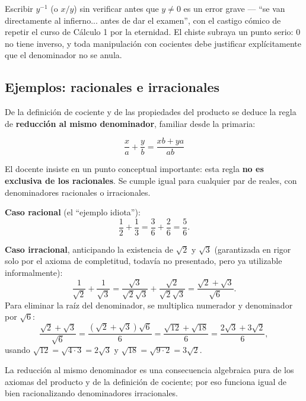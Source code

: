 \documentclass[12pt,a4paper]{article}
\begin{document}
\begin{warnbox}
Escribir $y^{-1}$ (o $x/y$) sin verificar antes que $y\ne 0$ es un error
grave --- ``se van directamente al infierno... antes de dar el examen'',
con el castigo cómico de repetir el curso de Cálculo 1 por la eternidad. El
chiste subraya un punto serio: $0$ no tiene inverso, y toda manipulación
con cocientes debe justificar explícitamente que el denominador no se
anula.
\end{warnbox}

\subsection{Ejemplos: racionales e irracionales}

De la definición de cociente y de las propiedades del producto se deduce la
regla de \textbf{reducción al mismo denominador}, familiar desde la
primaria:

\begin{keybox}
\[
\boxed{\dfrac{x}{a} + \dfrac{y}{b} = \dfrac{xb + ya}{ab}}
\]
\end{keybox}

El docente insiste en un punto conceptual importante: esta regla \textbf{no
es exclusiva de los racionales}. Se cumple igual para cualquier par de
reales, con denominadores racionales o irracionales.

\textbf{Caso racional} (el ``ejemplo idiota''):
\[
\frac{1}{2}+\frac{1}{3} = \frac{3}{6}+\frac{2}{6} = \frac{5}{6}.
\]

\textbf{Caso irracional}, anticipando la existencia de $\sqrt2$ y $\sqrt3$
(garantizada en rigor solo por el axioma de completitud, todavía no
presentado, pero ya utilizable informalmente):
\[
\frac{1}{\sqrt2}+\frac{1}{\sqrt3} = \frac{\sqrt3}{\sqrt2\sqrt3}+\frac{\sqrt2}{\sqrt2\sqrt3} = \frac{\sqrt2+\sqrt3}{\sqrt6}.
\]
Para eliminar la raíz del denominador, se multiplica numerador y
denominador por $\sqrt6$:
\[
\frac{\sqrt2+\sqrt3}{\sqrt6} = \frac{(\sqrt2+\sqrt3)\sqrt6}{6} = \frac{\sqrt{12}+\sqrt{18}}{6}
= \frac{2\sqrt3 + 3\sqrt2}{6},
\]
usando $\sqrt{12}=\sqrt{4\cdot3}=2\sqrt3$ y $\sqrt{18}=\sqrt{9\cdot2}=3\sqrt2$.

\begin{notebox}
La reducción al mismo denominador es una consecuencia algebraica pura de
los axiomas del producto y de la definición de cociente; por eso funciona
igual de bien racionalizando denominadores irracionales.
\end{notebox}
\end{document}
